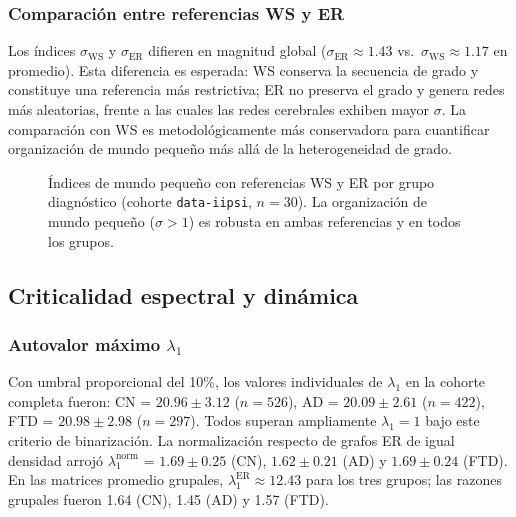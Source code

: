 \documentclass[12pt,a4paper]{article}
\begin{document}
\subsubsection{Comparación entre referencias WS y ER}

Los índices $\sigma_{\text{WS}}$ y $\sigma_{\text{ER}}$ difieren en magnitud global
($\sigma_{\text{ER}} \approx 1.43$ vs.\ $\sigma_{\text{WS}} \approx 1.17$ en promedio). Esta
diferencia es esperada: WS conserva la secuencia de grado y constituye una referencia más
restrictiva; ER no preserva el grado y genera redes más aleatorias, frente a las cuales las
redes cerebrales exhiben mayor $\sigma$. La comparación con WS es metodológicamente más
conservadora para cuantificar organización de mundo pequeño más allá de la heterogeneidad de
grado.

\begin{figure}[H]
  \centering
  \caption{Índices de mundo pequeño con referencias WS y ER por grupo diagnóstico
  (cohorte \texttt{data-iipsi}, $n = 30$). La organización de mundo pequeño ($\sigma > 1$)
  es robusta en ambas referencias y en todos los grupos.}
  \label{fig:small_world}
\end{figure}

\subsection{Criticalidad espectral y dinámica}

\subsubsection{Autovalor máximo $\lambda_1$}

Con umbral proporcional del 10\%, los valores individuales de $\lambda_1$ en la cohorte
completa fueron: CN = $20.96 \pm 3.12$ ($n = 526$), AD = $20.09 \pm 2.61$ ($n = 422$),
FTD = $20.98 \pm 2.98$ ($n = 297$). Todos superan ampliamente $\lambda_1 = 1$ bajo este
criterio de binarización. La normalización respecto de grafos ER de igual densidad arrojó
$\lambda_1^{\text{norm}}$ = $1.69 \pm 0.25$ (CN), $1.62 \pm 0.21$ (AD) y $1.69 \pm 0.24$
(FTD). En las matrices promedio grupales, $\lambda_1^{\text{ER}} \approx 12.43$ para los tres
grupos; las razones grupales fueron 1.64 (CN), 1.45 (AD) y 1.57 (FTD).
\end{document}
